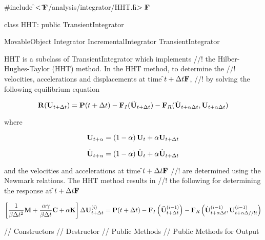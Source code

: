 
\indent \#include \f$<\tilde{ }{\bf F}$/analysis/integrator/HHT.h\f$>{\bf F}$

\indent class HHT: public TransientIntegrator

\indent MovableObject
\indent\indent Integrator
\indent\indent\indent IncrementalIntegrator
\indent\indent\indent\indent TransientIntegrator
\indent\indent\indent\indent{}

\indent HHT is a subclass of TransientIntegrator which implements
//! the Hilber-Hughes-Taylor (HHT) method. In the HHT method, to determine the
//! velocities, accelerations and displacements at time \f$t + \Delta t{\bf F}$,
//! by solving the following equilibrium equation

\[ {\bf R} ({\bf U}_{t + \Delta t}) = {\bf P}(t + \Delta t) -
{\bf F}_I(\ddot{\bf U}_{t+\Delta t}) - {\bf F}_R(\dot{\bf U}_{t + \alpha \Delta t},{\bf U}_{t +
\alpha \Delta t}) \] 

\noindent where

\[ {\bf U}_{t + \alpha} = \left( 1 - \alpha \right) {\bf U}_t + \alpha {\bf U}_{t +
\Delta t} \]

\[ \dot{\bf U}_{t + \alpha} = \left( 1 - \alpha \right) \dot{\bf U}_t + \alpha \dot{\bf U}_{t +
\Delta t} \]

\noindent and the velocities and accelerations at time \f$t + \Delta t{\bf F}$
//! are determined using the Newmark relations. The HHT method results in
//! the following for determining the response at \f$t + \Delta t{\bf F}$

\[ \left[ \frac{1}{\beta \Delta t^2} {\bf M} + \frac{\alpha \gamma}{\beta
\Delta t} {\bf C} + \alpha {\bf K} \right] \Delta {\bf U}_{t + \Delta t}^{(i)} = {\bf P}(t
+ \Delta t) - {\bf F}_I\left(\ddot{\bf U}_{t+\Delta  t}^{(i-1)}\right)
- {\bf F}_R\left(\dot{\bf U}_{t + \alpha \Delta t}^{(i-1)},{\bf U}_{t + \alpha \Delta
//! t}^{(i-1)}\right) \] 


\indent // Constructors
\indent // Destructor
\indent // Public Methods
\indent // Public Methods for Output

